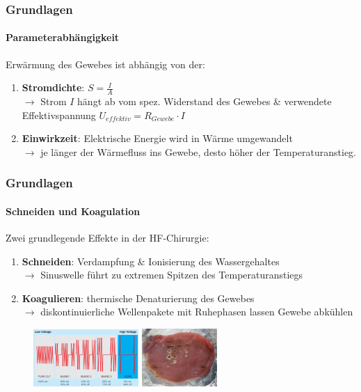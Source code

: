 \documentclass{beamer}
\begin{document}
\begin{frame}
\frametitle{Grundlagen}
\framesubtitle{Parameterabhängigkeit}
\begin{center}
	Erwärmung des Gewebes ist abhängig von der:
\end{center}
\begin{enumerate}
	\item \textbf{Stromdichte}: $S=\frac{I}{A}$
	\\$\rightarrow$ Strom $I$ hängt ab vom spez. Widerstand des Gewebes \& verwendete Effektivspannung $U_{effektiv}=R_{Gewebe}\cdot I$
	\vspace{0.5cm}
	\item \textbf{Einwirkzeit}: Elektrische Energie wird in Wärme umgewandelt
	\\$\rightarrow$ je länger der Wärmefluss ins Gewebe, desto höher der Temperaturanstieg.
\end{enumerate}
\end{frame}


\begin{frame}
\frametitle{Grundlagen}
\framesubtitle{Schneiden und Koagulation}
	Zwei grundlegende Effekte in der HF-Chirurgie:
	\vspace{0.5cm}
	\begin{enumerate}
		\item \textbf{Schneiden}: Verdampfung \& Ionisierung des Wassergehaltes
		\\$\rightarrow$ Sinuswelle führt zu extremen Spitzen des Temperaturanstiegs
		\vspace{0.1cm}
		\item \textbf{Koagulieren}: thermische Denaturierung des Gewebes
		\\$\rightarrow$ diskontinuierliche Wellenpakete mit Ruhephasen lassen Gewebe abkühlen
	\end{enumerate}
	\begin{figure}
	\includegraphics[width=4cm]{images/stromModi.png}
	\hspace{0.5cm}
	\includegraphics[width=2.85cm]{images/fleisch.png}
	\cite{stromModi}
	\end{figure}
\end{frame}
\end{document}
